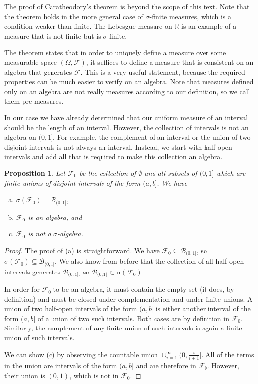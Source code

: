 \documentclass{book}
\theoremstyle{plain}%
\newtheorem{proposition}{Proposition}[section]
\theoremstyle{definition}
\begin{document}
The proof of Caratheodory's theorem is beyond the scope of this text. Note that the theorem holds in the more general case of $\sigma$-finite measures, which is a condition weaker than finite. The Lebesgue measure on $\mathbb{R}$ is an example of a measure that is not finite but is $\sigma$-finite.

The theorem states that in order to uniquely define a measure over some measurable space $(\Omega, \mathcal{F})$, it suffices to define a measure that is consistent on an algebra that generates $\mathcal{F}$. This is a very useful statement, because the required properties can be much easier to verify on an algebra. Note that measures defined only on an algebra are not really measures according to our definition, so we call them pre-measures.

In our case we have already determined that our uniform measure of an interval should be the length of an interval. However, the collection of intervals is not an algebra on $(0,1]$. For example, the complement of an interval or the union of two disjoint intervals is not always an interval. Instead, we start with half-open intervals and add all that is required to make this collection an algebra.

\begin{proposition} Let $\mathcal{F}_0$ be the collection of $\emptyset$ and all subsets of $(0, 1]$ which are finite unions of disjoint intervals of the form $(a, b]$. We have

\begin{enumerate}[(a)]
\item $\sigma(\mathcal{F}_0) = \mathcal{B}_{(0,1]} $,
\item $\mathcal{F}_0$ is an algebra, and
\item $\mathcal{F}_0$ is not a $\sigma$-algebra.
\end{enumerate}
\end{proposition}

\begin{proof}
The proof of (a) is straightforward. We have $\mathcal{F}_0 \subseteq \mathcal{B}_{(0,1]}$, so $\sigma(\mathcal{F}_0) \subseteq \mathcal{B}_{(0,1]}$. We also know from before that the collection of all half-open intervals generates $\mathcal{B}_{(0,1]}$, so $\mathcal{B}_{(0,1]} \subset \sigma(\mathcal{F}_0)$.

In order for $\mathcal{F}_0$ to be an algebra, it must contain the empty set (it does, by definition) and must be closed under complementation and under finite unions. A union of two half-open intervals of the form $(a, b]$ is either another interval of the form $(a, b]$ of a union of two such intervals. Both cases are by definition in $\mathcal{F}_0$. Similarly, the complement of any finite union of such intervals is again a finite union of such intervals.

We can show (c) by observing the countable union $\cup_{i=1}^\infty (0, \frac{i}{i+1}]$. All of the terms in the union are intervals of the form $(a, b]$ and are therefore in $\mathcal{F}_0$. However, their union is $(0, 1)$, which is not in $\mathcal{F}_0$.
\end{proof}
\end{document}
